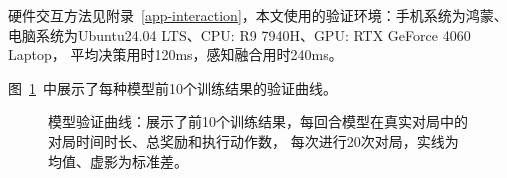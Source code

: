 硬件交互方法见附录~\ref{app-interaction}，本文使用的验证环境：手机系统为鸿蒙、电脑系统为Ubuntu24.04 LTS、CPU: R9 7940H、GPU: RTX GeForce 4060 Laptop，
平均决策用时120ms，感知融合用时240ms。

图~\ref{fig-model-eval}~中展示了每种模型前10个训练结果的验证曲线。

\begin{figure}[h!]
  \centering
  \setlength{\abovecaptionskip}{0ex}  %
  \caption{模型验证曲线：展示了前10个训练结果，每回合模型在真实对局中的对局时间时长、总奖励和执行动作数，
  每次进行20次对局，实线为均值、虚影为标准差。}\label{fig-model-eval}
\end{figure}
